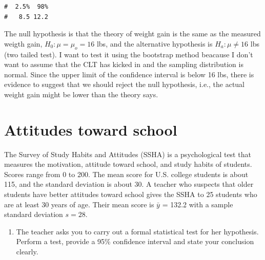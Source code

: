 \documentclass[letterpaper,11pt,twoside,]{pinp}
\providecommand{\tightlist}{%
  \setlength{\itemsep}{0pt}\setlength{\parskip}{0pt}}
\begin{document}
\begin{Shaded}
\begin{Highlighting}[]
 \NormalTok{, }\NormalTok{)) }\SpecialCharTok{*} 
\end{Highlighting}
\end{Shaded}

\begin{ShadedResult}
\begin{verbatim}
#  2.5%  98% 
#   8.5 12.2
\end{verbatim}
\end{ShadedResult}

The null hypothesis is that the theory of weight gain is the same as the
measured weigth gain, \(H_0: \mu = \mu_o = 16\) lbs, and the alternative
hypothesis is \(H_a: \mu \neq 16\) lbs (two tailed test). I want to test
it using the bootstrap method beacause I don't want to assume that the
CLT has kicked in and the sampling distribution is normal. Since the
upper limit of the confidence interval is below 16 lbs, there is
evidence to suggest that we should reject the null hypothesis, i.e., the
actual weight gain might be lower than the theory says.

\newpage

\hypertarget{attitudes-toward-school}{%
\section{Attitudes toward school}\label{attitudes-toward-school}}

The Survey of Study Habits and Attitudes (SSHA) is a psychological test
that measures the motivation, attitude toward school, and study habits
of students. Scores range from 0 to 200. The mean score for U.S. college
students is about 115, and the standard deviation is about 30. A teacher
who suspects that older students have better attitudes toward school
gives the SSHA to 25 students who are at least 30 years of age. Their
mean score is \(\bar{y}\) = 132.2 with a sample standard deviation
\(s = 28\).

\begin{enumerate}
\def\labelenumi{\alph{enumi}.}
\tightlist
\item
  The teacher asks you to carry out a formal statistical test for her
  hypothesis. Perform a test, provide a 95\% confidence interval and
  state your conclusion clearly.
\end{enumerate}
\end{document}
